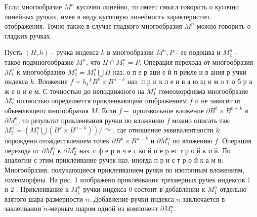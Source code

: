 \documentclass[10pt]{article}
\begin{document}
Если многообразие $M^{n}$ кусочно линейно, то имеет смысл говорить о кусочно линейных ручках, имея в виду кусочную линейность характеристич. отображения. Точно также в случае гладкого многообразия $M^{n}$ можно говорить о гладких ручках.



Пусть $(H, h)$ - ручка индекса $k$ в многообразии $M^{n}, P$ - ее подошва и $M_{1}^{n}$ - такое подмногообразие $M^{n}$, что $H \cap M_{1}^{n}=P$. Операция перехода от многообразия $M_{1}^{n}$ к многообразию $M_{2}^{n}=M_{1}^{n} \bigcup H$ наз. о п е р аци е й п рикле и в ания р учки индекса $k$. Вложение $f=h_{1}{ }^{k} B^{k} \times B^{n-k}$ наз. п р и к л е и в а ю щ и м о т о б р а ж е н и е м. С точностью до неподвижного на $M_{1}^{n}$ гомеоморфизма многообразие $M_{2}^{n}$ полностью определяется приклеивающим отображением $f$ и не зависит от объемлющего многообразия $M$. Если $f-$ произвольное вложение $\partial B^{k} \times B^{n-k}$ в $\partial M_{1}^{n}$, то результат приклеивания ручки по вложению $f$ можно описать так: $M_{2}^{n}=\left(M_{1}^{n} \bigcup\left(B^{k} \times B^{n-k}\right)\right) / \curvearrowright$, где отношение эквивалентности \& порождено отождествлением точек $\partial B^{k} \times B^{n-k}$ и $\partial M_{1}^{n}$ по вложению $f$. Операция перехода от $\partial M_{1}^{n}$ к $\partial M_{2}^{n}$ наз. с ф е р и ч е с ко й п е p ес т р о й к о й. По аналогии с этим приклеивание ручек наз. иногда п р и с т р о й к а м и. Многообразия, получающиеся приклеиванием ручки по изотопным вложениям, гомеоморфны. На рис. 1 изображено приклеивание трехмерных ручек индексов 1 и 2 . Приклеивание к $M_{1}^{n}$ ручки индекса 0 состоит в добавлении к $M_{1}^{n}$ отдельно взятого шара размерности $n$. Добавление ручки индекса $n$ заключается в заклеивании $n$-мерным шаром одной из компонент $\partial M_{1}^{n}$.
\end{document}
